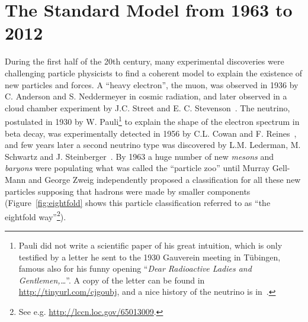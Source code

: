 

\section{The Standard Model from 1963 to 2012}\label{sec:THsm}




During the first half of the 20th century, many experimental 
discoveries were challenging particle physicists to find a 
coherent model to explain the existence of new particles and 
forces. A ``heavy electron'', the muon, was observed in 1936 
by C.%
 Anderson and S.%
 Neddermeyer in cosmic radiation, and later
observed in a cloud chamber experiment by %
J.C. Street and E. C. Stevenson~\cite{PhysRev.52.1003}. 
The neutrino, postulated in 1930 by %
W. Pauli\footnote{Pauli did not write a scientific
paper of his great intuition, which is only testified 
by a letter he sent to the 1930 Gauverein meeting in T\"ubingen,
famous also for his funny opening 
``{\it Dear Radioactive Ladies and Gentlemen,\dots}''. A copy
of the letter can be found in \url{http://tinyurl.com/cjgoubj}, 
and a nice history of the neutrino is in~\cite{2006physics...3106P}.}
to explain the shape of the electron 
spectrum in beta decay, was experimentally 
detected in 1956 by %
C.L. Cowan and %
F. Reines~\cite{1956Sci...124..103C}, and few years later a 
second neutrino type was discovered by %
L.M. Lederman, %
M. Schwartz and %
J. Steinberger~\cite{1962PhRvL...9...36D}. 
By 1963 a huge number of new {\it mesons} and {\it baryons} 
were populating what was called the ``particle zoo'' 
until Murray Gell-Mann and George Zweig independently proposed 
a classification for all these new particles 
supposing that hadrons were made by smaller 
components~\cite{GellMann1964214,Zweig:352337}
(Figure~\ref{fig:eightfold} shows this particle classification referred to as 
``the eightfold way''\footnote{See e.g. \url{http://lccn.loc.gov/65013009}.}). 


